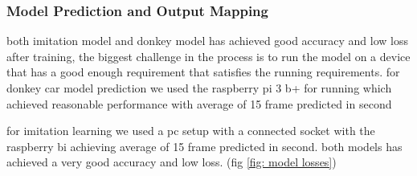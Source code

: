 \subsubsection{Model Prediction and Output Mapping}

\hspace {2cm}both imitation model and donkey model has achieved good accuracy and low loss after training, the biggest challenge in the process is to run the model on a device that has a good enough requirement that satisfies the running requirements.
for donkey car model prediction we used the raspberry pi 3 b+ for running which achieved reasonable performance with average of 15 frame predicted in second

for imitation learning we used a pc setup with a connected socket with the raspberry bi achieving average of 15 frame predicted in second.
both models has achieved a very good accuracy and low loss.
(fig \ref{fig:  model losses})